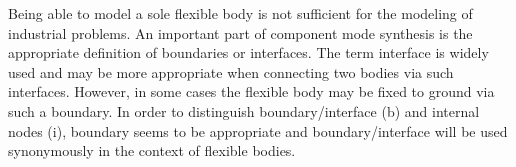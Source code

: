 %


\label{sec:theory:CMS:interfaces}
Being able to model a sole flexible body is not sufficient for the modeling of industrial problems.
An important part of component mode synthesis is the appropriate definition of boundaries or interfaces.
The term interface is widely used and may be more appropriate when connecting two bodies via such interfaces.
However, in some cases the flexible body may be fixed to ground via such a boundary. In order to distinguish boundary/interface (b) and internal nodes (i), boundary seems to be appropriate and boundary/interface will be used synonymously in the context of flexible bodies.

